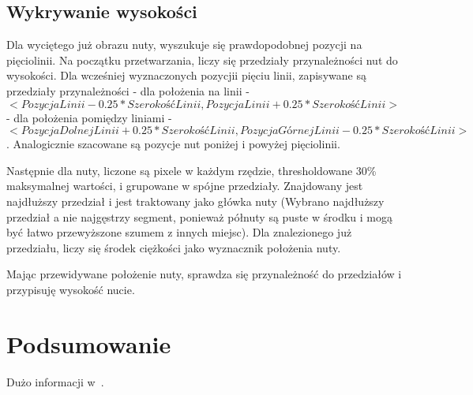 \documentclass[a4paper,11pt]{article}
\begin{document}
\subsection{Wykrywanie wysokości}
Dla wyciętego już obrazu nuty, wyszukuje się prawdopodobnej pozycji na pięciolinii.
Na początku przetwarzania, liczy się przedziały przynależności nut do wysokości.
Dla wcześniej wyznaczonych pozycjii pięciu linii, zapisywane są przedziały przynależności - dla położenia na linii -
$<PozycjaLinii - 0.25 * SzerokośćLinii, PozycjaLinii + 0.25 * SzerokośćLinii>$ - dla położenia pomiędzy liniami -
$<PozycjaDolnejLinii + 0.25 * SzerokośćLinii, PozycjaGórnejLinii - 0.25 * SzerokośćLinii>$.
Analogicznie szacowane są pozycje nut poniżej i powyżej pięciolinii.

Następnie dla nuty, liczone są pixele w każdym rzędzie, thresholdowane 30\% maksymalnej wartości, i grupowane w spójne przedziały.
Znajdowany jest najdłuższy przedział i jest traktowany jako główka nuty
(Wybrano najdłuższy przedział a nie najgęstrzy segment, ponieważ półnuty są puste w środku i mogą być łatwo przewyższone szumem z innych miejsc).
Dla znalezionego już przedziału, liczy się środek ciężkości jako wyznacznik położenia nuty.

Mając przewidywane położenie nuty, sprawdza się przynależność do przedziałów i przypisuję wysokość nucie.

\section{Podsumowanie}

Dużo informacji w~\cite{10strategies}.



\end{document}
